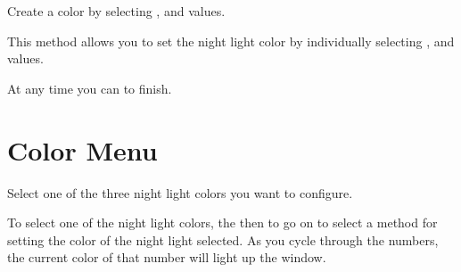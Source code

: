  \par\medskip

Create a color by selecting ,  and  values.

\par\medskip

This method allows you to set the night light color by individually selecting
,  and  values.


At any time you can  to finish.


\section{Color Menu} 

Select one of the three night light colors you want to configure.

\par\medskip

To select one of the night light colors,  the  then 
to go on to select a method for setting the color of the night light selected.
As you cycle through the numbers, the current color of that number will light up
the  window.


